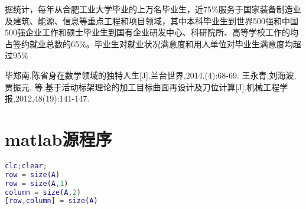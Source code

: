 \documentclass{article}
\newcommand{\upcite}[1]{\textsuperscript{\textsuperscript{\cite{#1}}}}
\begin{document}
据统计，每年从合肥工业大学毕业的上万名毕业生，近75\%服务于国家装备制造业及建筑、能源、信息等重点工程和项目领域，其中本科毕业生到世界500强和中国500强企业工作和硕士毕业生到国有企业研发中心、科研院所、高等学校工作的均占签约就业总数的65\%。毕业生对就业状况满意度和用人单位对毕业生满意度均超过95\%\upcite{bib:two}
\begin{thebibliography}{9}%
 毕郑南.陈省身在数学领域的独特人生[J].兰台世界,2014,(4):68-69.
 王永青,刘海波,贾振元, 等.基于活动标架理论的加工目标曲面再设计及刀位计算[J].机械工程学报,2012,48(19):141-147. 
\end{thebibliography}
\section*{matlab源程序}
\begin{lstlisting}[language=matlab]
clc;clear;
row = size(A) 
row = size(A,1) 
column = size(A,2) 
[row,column] = size(A) 
\end{lstlisting}
\end{document}
